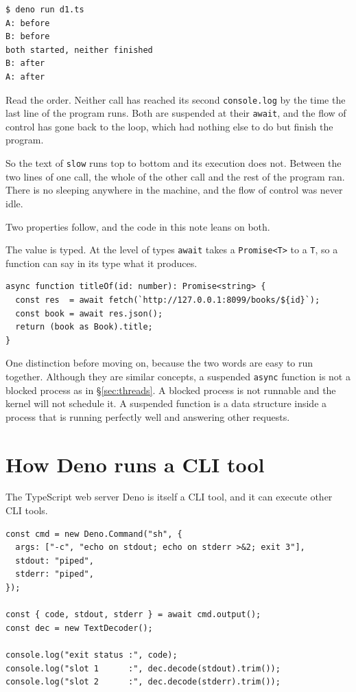 \documentclass[11pt,a4paper]{article}
\begin{document}
\begin{lstlisting}[language=SH]
$ deno run d1.ts
A: before
B: before
both started, neither finished
B: after
A: after
\end{lstlisting}

Read the order. Neither call has reached its second \texttt{console.log} by the time the last line
of the program runs. Both are suspended at their \texttt{await}, and the flow of control has gone
back to the loop, which had nothing else to do but finish the program.

So the text of \texttt{slow} runs top to bottom and its execution does not. Between the two lines
of one call, the whole of the other call and the rest of the program ran. There is no sleeping
anywhere in the machine, and the flow of control was never idle.

Two properties follow, and the code in this note leans on both.

The value is typed. At the level of types \texttt{await} takes a \texttt{Promise<T>} to a
\texttt{T}, so a function can say in its type what it produces.

\begin{lstlisting}[language=TS]
async function titleOf(id: number): Promise<string> {
  const res  = await fetch(`http://127.0.0.1:8099/books/${id}`);
  const book = await res.json();
  return (book as Book).title;
}
\end{lstlisting}

\begin{sectionbox}
One distinction before moving on, because the two words are easy to run together. Although they are
similar concepts, a suspended \texttt{async} function is not a blocked process as in
\S\ref{sec:threads}. A blocked process is not runnable and the kernel will not schedule it. A
suspended function is a data structure inside a process that is running perfectly well and
answering other requests.
\end{sectionbox}

\newpage

\section{How Deno runs a CLI tool}
\label{sec:denocmd}

The TypeScript web server Deno is itself a CLI tool, and it can execute other CLI tools.

\begin{lstlisting}[language=TS]
const cmd = new Deno.Command("sh", {
  args: ["-c", "echo on stdout; echo on stderr >&2; exit 3"],
  stdout: "piped",
  stderr: "piped",
});

const { code, stdout, stderr } = await cmd.output();
const dec = new TextDecoder();

console.log("exit status :", code);
console.log("slot 1      :", dec.decode(stdout).trim());
console.log("slot 2      :", dec.decode(stderr).trim());
\end{lstlisting}
\end{document}
